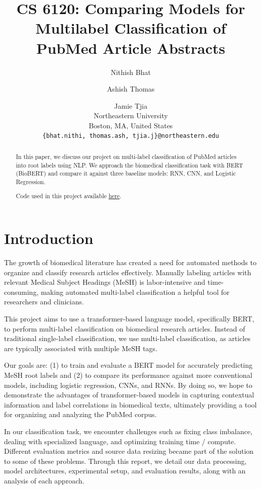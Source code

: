 \documentclass[11pt]{article}
\title{CS 6120: Comparing Models for Multilabel Classification of PubMed Article
	Abstracts}
\author{Nithish Bhat \and Ashish Thomas \and Jamie Tjia \\ Northeastern
	University \\ Boston, MA, United States \\ \texttt{\{bhat.nithi, thomas.ash, tjia.j\}@northeastern.edu}
	\\ }
\begin{document}
\maketitle
\begin{abstract}
	In this paper, we discuss our project on multi-label classification of PubMed articles into
	root labels using NLP. We approach the biomedical classification task with BERT (BioBERT)
	and compare it against three baseline models: RNN, CNN, and Logistic Regression.

	Code used in this project available \href{https://github.com/jktjia/PubMed-Multilabel-Classifiction/}{here}.
\end{abstract}

\section{Introduction}

The growth of biomedical literature has created a need for automated methods to organize and
classify research articles effectively. Manually labeling articles with relevant Medical Subject
Headings (MeSH) is labor-intensive and time-consuming, making automated multi-label classification
a helpful tool for researchers and clinicians.

This project aims to use a transformer-based language model, specifically BERT, to perform
multi-label classification on biomedical research articles. Instead of traditional single-label
classification, we use multi-label classification, as articles are typically associated with
multiple MeSH tags.

Our goals are: (1) to train and evaluate a BERT model for accurately predicting MeSH root labels
and (2) to compare its performance against more conventional models, including logistic regression,
CNNs, and RNNs. By doing so, we hope to demonstrate the advantages of transformer-based models in
capturing contextual information and label correlations in biomedical texts, ultimately providing a
tool for organizing and analyzing the PubMed corpus.

In our classification task, we encounter challenges such as fixing class imbalance, dealing with
specialized language,  and optimizing training time / compute. Different evaluation metrics and
source data resizing became part of the solution to some of these problems. Through this report, we
detail our data processing, model architectures, experimental setup, and evaluation results, along
with an analysis of each approach.
\end{document}
